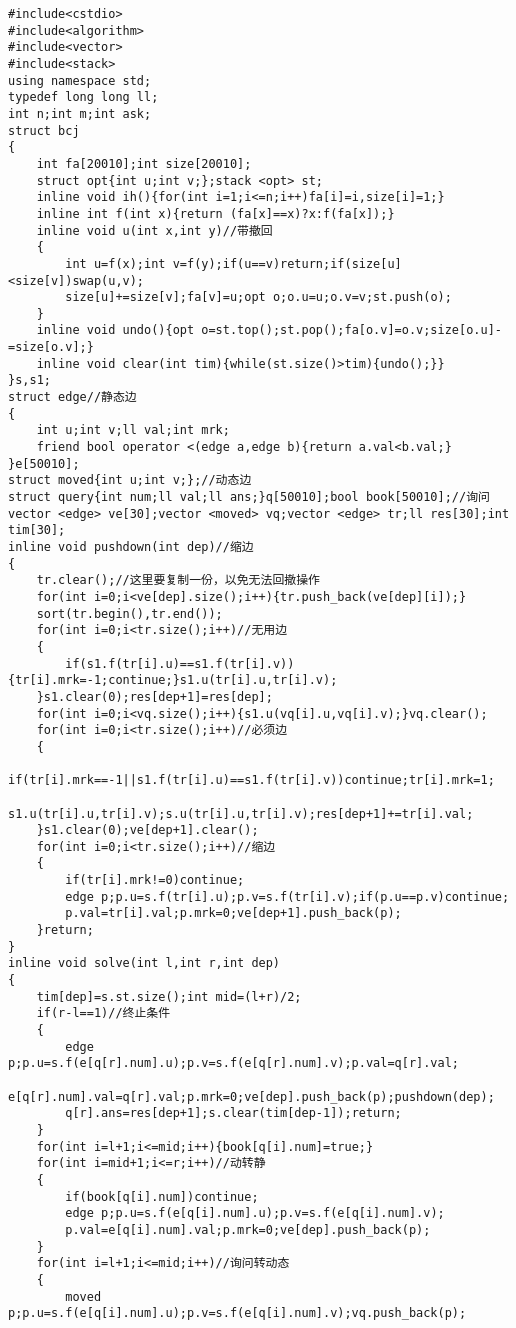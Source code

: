 \begin{verbatim}
#include<cstdio>
#include<algorithm>
#include<vector>
#include<stack>
using namespace std;
typedef long long ll;
int n;int m;int ask;
struct bcj
{
    int fa[20010];int size[20010];
    struct opt{int u;int v;};stack <opt> st;
    inline void ih(){for(int i=1;i<=n;i++)fa[i]=i,size[i]=1;}
    inline int f(int x){return (fa[x]==x)?x:f(fa[x]);}
    inline void u(int x,int y)//带撤回
    {
        int u=f(x);int v=f(y);if(u==v)return;if(size[u]<size[v])swap(u,v);
        size[u]+=size[v];fa[v]=u;opt o;o.u=u;o.v=v;st.push(o);   
    }
    inline void undo(){opt o=st.top();st.pop();fa[o.v]=o.v;size[o.u]-=size[o.v];}
    inline void clear(int tim){while(st.size()>tim){undo();}}
}s,s1;
struct edge//静态边
{
    int u;int v;ll val;int mrk;
    friend bool operator <(edge a,edge b){return a.val<b.val;}
}e[50010];
struct moved{int u;int v;};//动态边
struct query{int num;ll val;ll ans;}q[50010];bool book[50010];//询问
vector <edge> ve[30];vector <moved> vq;vector <edge> tr;ll res[30];int tim[30];
inline void pushdown(int dep)//缩边
{
    tr.clear();//这里要复制一份，以免无法回撤操作
    for(int i=0;i<ve[dep].size();i++){tr.push_back(ve[dep][i]);}
    sort(tr.begin(),tr.end());
    for(int i=0;i<tr.size();i++)//无用边
    {
        if(s1.f(tr[i].u)==s1.f(tr[i].v)){tr[i].mrk=-1;continue;}s1.u(tr[i].u,tr[i].v);
    }s1.clear(0);res[dep+1]=res[dep];
    for(int i=0;i<vq.size();i++){s1.u(vq[i].u,vq[i].v);}vq.clear();
    for(int i=0;i<tr.size();i++)//必须边
    {
        if(tr[i].mrk==-1||s1.f(tr[i].u)==s1.f(tr[i].v))continue;tr[i].mrk=1;
        s1.u(tr[i].u,tr[i].v);s.u(tr[i].u,tr[i].v);res[dep+1]+=tr[i].val;
    }s1.clear(0);ve[dep+1].clear();
    for(int i=0;i<tr.size();i++)//缩边
    {
        if(tr[i].mrk!=0)continue;
        edge p;p.u=s.f(tr[i].u);p.v=s.f(tr[i].v);if(p.u==p.v)continue;
        p.val=tr[i].val;p.mrk=0;ve[dep+1].push_back(p);
    }return;
}
inline void solve(int l,int r,int dep)
{
    tim[dep]=s.st.size();int mid=(l+r)/2;
    if(r-l==1)//终止条件
    {
        edge p;p.u=s.f(e[q[r].num].u);p.v=s.f(e[q[r].num].v);p.val=q[r].val;
        e[q[r].num].val=q[r].val;p.mrk=0;ve[dep].push_back(p);pushdown(dep);
        q[r].ans=res[dep+1];s.clear(tim[dep-1]);return;
    }
    for(int i=l+1;i<=mid;i++){book[q[i].num]=true;}
    for(int i=mid+1;i<=r;i++)//动转静
    {
        if(book[q[i].num])continue;
        edge p;p.u=s.f(e[q[i].num].u);p.v=s.f(e[q[i].num].v);
        p.val=e[q[i].num].val;p.mrk=0;ve[dep].push_back(p);
    }
    for(int i=l+1;i<=mid;i++)//询问转动态
    {
        moved p;p.u=s.f(e[q[i].num].u);p.v=s.f(e[q[i].num].v);vq.push_back(p);

\end{verbatim}
